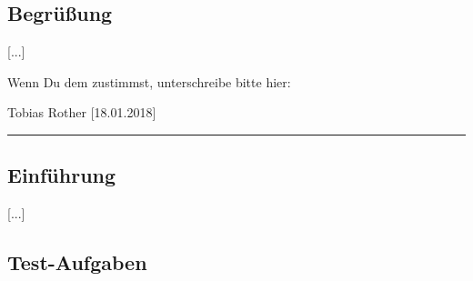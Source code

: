\subsection*{Begrüßung}
[...]

Wenn Du dem zustimmst, unterschreibe bitte hier:

\vspace*{1em}
Tobias Rother [18.01.2018]\vspace*{-.9em}\\
\noindent\rule{8cm}{0.4pt}

\subsection*{Einführung}
[...]


\subsection*{Test-Aufgaben}
